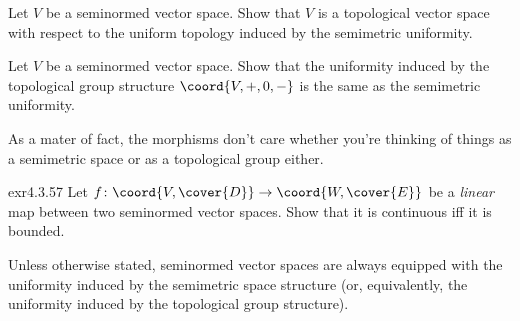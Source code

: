 \begin{exr}{}{}
Let $V$ be a seminormed vector space.  Show that $V$ is a topological vector space with respect to the uniform topology induced by the semimetric uniformity.
\end{exr}
\begin{exr}{}{}
Let $V$ be a seminormed vector space.  Show that the uniformity induced by the topological group structure $\coord{V,+,0,-}$ is the same as the semimetric uniformity.
\end{exr}
As a mater of fact, the morphisms don't care whether you're thinking of things as a semimetric space or as a topological group either.
\begin{exr}{}{exr4.3.57}
Let $f\colon \coord{V,\cover{D}}\rightarrow \coord{W,\cover{E}}$ be a \emph{linear} map between two seminormed vector spaces.  Show that it is continuous iff it is bounded.
\end{exr}
\begin{displayquote}
Unless otherwise stated, seminormed vector spaces are always equipped with the uniformity induced by the semimetric space structure (or, equivalently, the uniformity induced by the topological group structure).
\end{displayquote}

